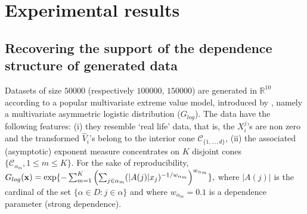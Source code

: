 
\section{Experimental results}
\label{jmva:sec:experiments}
\subsection{Recovering the support of the dependence structure of generated data}
Datasets of size $50000$ (respectively $100000$, $150000$) are  generated in $\mathbb{R}^{10}$ according to a popular multivariate extreme value
model, introduced by \cite{Tawn90},  namely a multivariate asymmetric
logistic distribution ($G_{log}$). %
The data have the following features: (i) they resemble `real life'
data, that is, the $X_i^j$'s are non
zero  and the transformed $\hat V_i$'s belong to the interior cone
$\mathcal{C}_{\{1,\ldots,d\}}$, (ii) the associated (asymptotic) exponent measure concentrates on
 $K$ disjoint cones $\{\mathcal{C}_{\alpha_m} , 1\le m\le K\}$.  %
 For the sake of reproducibility, %
 $ G_{log}(\mathbf x) = \exp\{ - \sum_{m = 1}^K \left(\sum_{j \in \alpha_m}
     (|A(j)|x_j)^{ - 1/{w_{\alpha_m}}}\right)^{w_{\alpha_m}} \}, $
 where $|A(j)|$ is the cardinal of the set $\{\alpha\in D: j \in
 \alpha\}$ and where $w_{\alpha_m} = 0.1$ is a dependence parameter
 (strong dependence). %

